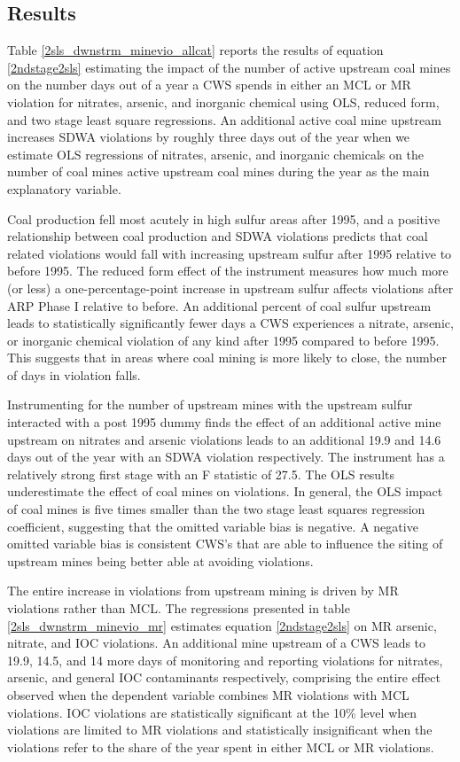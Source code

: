 \documentclass{article}
\begin{document}
\subsection{Results}

Table \ref{2sls_dwnstrm_minevio_allcat} reports the results of equation \ref{2ndstage2sls} estimating the impact of the number of active upstream coal mines on the number days out of a year a CWS spends in either an MCL or MR violation for nitrates, arsenic, and inorganic chemical using OLS, reduced form, and two stage least square regressions. An additional active coal mine upstream increases SDWA violations by roughly three days out of the year when we estimate OLS regressions of nitrates, arsenic, and inorganic chemicals on the number of coal mines active upstream coal mines during the year as the main explanatory variable.

Coal production fell most acutely in high sulfur areas after 1995, and a positive relationship between coal production and SDWA violations predicts that coal related violations would fall with increasing upstream sulfur after 1995 relative to before 1995. The reduced form effect of the instrument measures how much more (or less) a one-percentage-point increase in upstream sulfur affects violations after ARP Phase I relative to before. An additional percent of coal sulfur upstream leads to statistically significantly fewer days a CWS experiences a nitrate, arsenic, or inorganic chemical violation of any kind after 1995 compared to before 1995. This suggests that in areas where coal mining is more likely to close, the number of days in violation falls.

Instrumenting for the number of upstream mines with the upstream sulfur interacted with a post 1995 dummy finds the effect of an additional active mine upstream on nitrates and arsenic violations leads to an additional 19.9 and 14.6 days out of the year with an SDWA violation respectively. The instrument has a relatively strong first stage with an F statistic of 27.5. The OLS results underestimate the effect of coal mines on violations. In general, the OLS impact of coal mines is five times smaller than the two stage least squares regression coefficient, suggesting that the omitted variable bias is negative. A negative omitted variable bias is consistent CWS's that are able to influence the siting of upstream mines being better able at avoiding violations. 

The entire increase in violations from upstream mining is driven by MR violations rather than MCL. The regressions presented in table \ref{2sls_dwnstrm_minevio_mr} estimates equation \ref{2ndstage2sls} on MR arsenic, nitrate, and IOC violations. An additional mine upstream of a CWS leads to 19.9, 14.5, and 14 more days of monitoring and reporting violations for nitrates, arsenic, and general IOC contaminants respectively, comprising the entire effect observed when the dependent variable combines MR violations with MCL violations. IOC violations are statistically significant at the 10\% level when violations are limited to MR violations and statistically insignificant when the violations refer to the share of the year spent in either MCL or MR violations.
\end{document}
